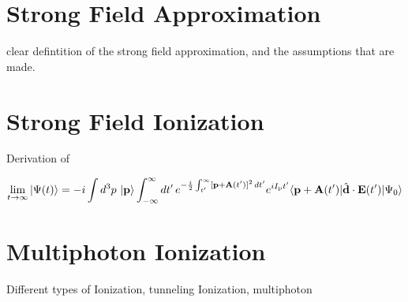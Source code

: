 \newpage
\section{Strong Field Approximation}

clear defintition of the strong field approximation, and the assumptions that are made.



\newpage
\section{Strong Field Ionization}

Derivation of 

\begin{equation}
    \lim_{t \to \infty} \ket{\Psi(t)}  = -i \int d^3 p\, \ket{\mathbf{p}} \int_{-\infty}^{\infty} dt'\, e^{-\frac{i}{2}\int_{t'}^{\infty} [\mathbf{p}+\mathbf{A}(t')]^2 \, dt'} e^{i I_\mathrm{p} t'} \langle \mathbf{p} + \mathbf{A}(t') | \hat{\mathbf{d}} \cdot \mathbf{E}(t') | \Psi_0 \rangle
\end{equation}



\newpage
\section{Multiphoton Ionization}

Different types of Ionization, tunneling Ionization, multiphoton